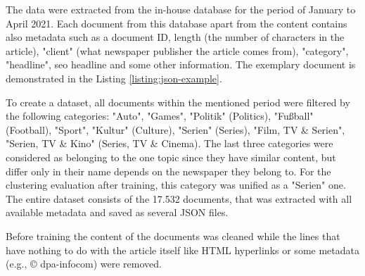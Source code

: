 \documentclass[fontsize=12pt,a4paper,twoside,openany]{scrbook}
\begin{document}
The data were extracted from the in-house database for the period of January to April 2021. Each document from this database apart from the content contains also metadata such as a document ID, length (the number of characters in the article), "client" (what newspaper publisher the article comes from), "category", "headline", seo headline and some other information. The exemplary document is demonstrated in the Listing \ref{listing:json-example}.

To create a dataset, all documents within the mentioned period were filtered by the following categories: "Auto", "Games", "Politik" (Politics), "Fußball" (Football), "Sport", "Kultur" (Culture), "Serien" (Series), "Film, TV \& Serien", "Serien, TV \& Kino" (Series, TV \& Cinema). The last three categories were considered as belonging to the one topic since they have similar content, but differ only in their name depends on the newspaper they belong to. For the clustering evaluation after training, this category was unified as a "Serien" one. The entire dataset consists of the 17.532 documents, that was extracted with all available metadata and saved as several JSON files.

Before training the content of the documents was cleaned while the lines that have nothing to do with the article itself like HTML hyperlinks or some metadata (e.g., © dpa-infocom) were removed.
\end{document}
